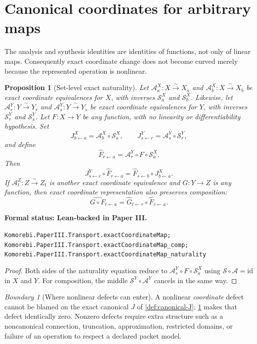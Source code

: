 \documentclass[11pt]{article}
\newtheorem{proposition}[theorem]{Proposition}
\theoremstyle{definition}
\theoremstyle{remark}
\newtheorem{boundary}[theorem]{Boundary}
\newcommand{\cA}{\mathcal A}
\newcommand{\cS}{\mathcal S}
\newcommand{\id}{\mathrm{id}}
\newcommand{\leanname}[1]{\nolinkurl{#1}}
\newcommand{\statusleanthree}[1]{%
  \par\smallskip\noindent
  {\color{leanblue}\textbf{Formal status: Lean-backed in Paper III.}}\par
  \begingroup\small\raggedright\leanname{#1}\par\endgroup\smallskip}
\begin{document}
\section{Canonical coordinates for arbitrary maps}
\label{sec:arbitrary-maps}

The analysis and synthesis identities are identities of functions, not only
of linear maps.  Consequently exact coordinate change does not become
curved merely because the represented operation is nonlinear.

\begin{proposition}[Set-level exact naturality]
\label{prop:set-naturality}
Let $\cA^X_a:X\xrightarrow{\sim}X_a$ and
$\cA^X_b:X\xrightarrow{\sim}X_b$ be exact coordinate equivalences for $X$,
with inverses $\cS^X_a$ and $\cS^X_b$.  Likewise, let
$\cA^Y_r:Y\xrightarrow{\sim}Y_r$ and
$\cA^Y_s:Y\xrightarrow{\sim}Y_s$ be exact coordinate equivalences for $Y$,
with inverses $\cS^Y_r$ and $\cS^Y_s$.  Let $F:X\to Y$ be any function, with
no linearity or differentiability hypothesis.  Set
\[
J^X_{b\leftarrow a}=\cA^X_b\circ\cS^X_a,
\qquad
J^Y_{s\leftarrow r}=\cA^Y_s\circ\cS^Y_r,
\]
and define
\[
\widehat F_{r\leftarrow a}
=
\cA^Y_r\circ F\circ\cS^X_a.
\]
Then
\[
J^Y_{s\leftarrow r}\circ\widehat F_{r\leftarrow a}
=
\widehat F_{s\leftarrow b}\circ J^X_{b\leftarrow a}.
\]
If $\cA^Z_t:Z\xrightarrow{\sim}Z_t$ is another exact coordinate equivalence
and $G:Y\to Z$ is any function, then exact coordinate representation also
preserves composition:
\[
\widehat{G\circ F}_{t\leftarrow a}
=
\widehat G_{t\leftarrow r}\circ\widehat F_{r\leftarrow a}.
\]
\end{proposition}
\statusleanthree{Komorebi.PaperIII.Transport.exactCoordinateMap; Komorebi.PaperIII.Transport.exactCoordinateMap_comp; Komorebi.PaperIII.Transport.exactCoordinateMap_naturality}

\begin{proof}
Both sides of the naturality equation reduce to
$\cA^Y_s\circ F\circ\cS^X_a$ using
$\cS\circ\cA=\id$ in $X$ and $Y$.  For composition, the middle
$\cS^Y\circ\cA^Y$ cancels in the same way.
\end{proof}

\begin{boundary}[Where nonlinear defects can enter]
A nonlinear \emph{coordinate} defect cannot be blamed on the exact canonical
$J$ of \cref{def:canonical-J}; \cref{prop:set-naturality} makes that defect
identically zero.  Nonzero defects require extra structure such as a
noncanonical connection, truncation, approximation, restricted domains, or
failure of an operation to respect a declared packet model.
\end{boundary}
\end{document}
